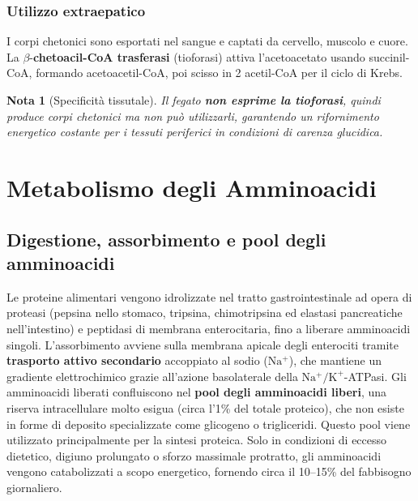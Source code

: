 \documentclass[12pt,a4paper]{report}
\newtheorem{nota}{Nota}[section]
\begin{document}
\subsection{Utilizzo extraepatico}
I corpi chetonici sono esportati nel sangue e captati da cervello, muscolo e cuore. La \(\beta\)-\textbf{chetoacil-CoA trasferasi} (tioforasi) attiva l'acetoacetato usando succinil-CoA, formando acetoacetil-CoA, poi scisso in 2 acetil-CoA per il ciclo di Krebs.
\begin{nota}[Specificità tissutale]
Il fegato \textbf{non esprime la tioforasi}, quindi produce corpi chetonici ma non può utilizzarli, garantendo un rifornimento energetico costante per i tessuti periferici in condizioni di carenza glucidica.
\end{nota}

\chapter{Metabolismo degli Amminoacidi}
\section{Digestione, assorbimento e pool degli amminoacidi}
Le proteine alimentari vengono idrolizzate nel tratto gastrointestinale ad opera di proteasi (pepsina nello stomaco, tripsina, chimotripsina ed elastasi pancreatiche nell'intestino) e peptidasi di membrana enterocitaria, fino a liberare amminoacidi singoli.
L'assorbimento avviene sulla membrana apicale degli enterociti tramite \textbf{trasporto attivo secondario} accoppiato al sodio (\(\mathrm{Na^+}\)), che mantiene un gradiente elettrochimico grazie all'azione basolaterale della \(\mathrm{Na^+/K^+}\)-ATPasi.
Gli amminoacidi liberati confluiscono nel \textbf{pool degli amminoacidi liberi}, una riserva intracellulare molto esigua (circa l'1\% del totale proteico), che non esiste in forme di deposito specializzate come glicogeno o trigliceridi. Questo pool viene utilizzato principalmente per la sintesi proteica. Solo in condizioni di eccesso dietetico, digiuno prolungato o sforzo massimale protratto, gli amminoacidi vengono catabolizzati a scopo energetico, fornendo circa il 10--15\% del fabbisogno giornaliero.
\end{document}
